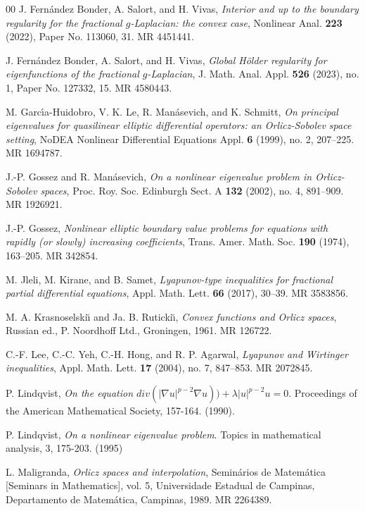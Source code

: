 \documentclass[12pt,reqno]{amsart}
\theoremstyle{definition}
\theoremstyle{remark}
\numberwithin{equation}{section}
\begin{document}
\begin{thebibliography}{00}
J. Fern\'andez Bonder, A. Salort, and H. Vivas, \emph{Interior and up to the boundary regularity for the fractional $g$-Laplacian: the convex case}, Nonlinear Anal. \textbf{223} (2022), Paper No. 113060, 31. MR 4451441.

J. Fern\'andez Bonder, A. Salort, and H. Vivas, \emph{Global H\"{o}lder regularity for eigenfunctions of the fractional $g$-Laplacian}, J. Math. Anal. Appl. \textbf{526} (2023), no. 1, Paper No. 127332, 15. MR 4580443.

M. Garc\'{\i}a-Huidobro, V. K. Le, R. Man\'{a}sevich, and K. Schmitt, \emph{On principal eigenvalues for quasilinear elliptic differential operators: an Orlicz-Sobolev space setting}, NoDEA Nonlinear Differential Equations Appl. \textbf{6} (1999), no. 2, 207--225. MR 1694787.

J.-P. Gossez and R. Man\'{a}sevich, \emph{On a nonlinear eigenvalue problem in Orlicz-Sobolev spaces}, Proc. Roy. Soc. Edinburgh Sect. A \textbf{132} (2002), no. 4, 891--909. MR 1926921.

J.-P. Gossez, \emph{Nonlinear elliptic boundary value problems for equations with rapidly (or slowly) increasing coefficients}, Trans. Amer. Math. Soc. \textbf{190} (1974), 163--205. MR 342854.

M. Jleli, M. Kirane, and B. Samet, \emph{Lyapunov-type inequalities for fractional partial differential equations}, Appl. Math. Lett. \textbf{66} (2017), 30--39. MR 3583856.

M. A. Krasnoselski\u{\i} and Ja. B. Ruticki\u{\i}, \emph{Convex functions and Orlicz spaces}, Russian ed., P. Noordhoff Ltd., Groningen, 1961. MR 126722.

C.-F. Lee, C.-C. Yeh, C.-H. Hong, and R. P. Agarwal, \emph{Lyapunov and Wirtinger inequalities}, Appl. Math. Lett. \textbf{17} (2004), no. 7, 847--853. MR 2072845.

 P. Lindqvist, \emph{On the equation $div(|\nabla u|^{p-2}\nabla u)) + \lambda |u|^{p-2}u=0$}. Proceedings of the American Mathematical Society, 157-164. (1990).

 P. Lindqvist, \emph{On a nonlinear eigenvalue problem}. Topics in mathematical analysis, 3, 175-203. (1995)

L. Maligranda, \emph{Orlicz spaces and interpolation}, Semin\'{a}rios de Matem\'{a}tica [Seminars in Mathematics], vol. 5, Universidade Estadual de Campinas, Departamento de Matem\'{a}tica, Campinas, 1989. MR 2264389.


\end{thebibliography}
\end{document}
